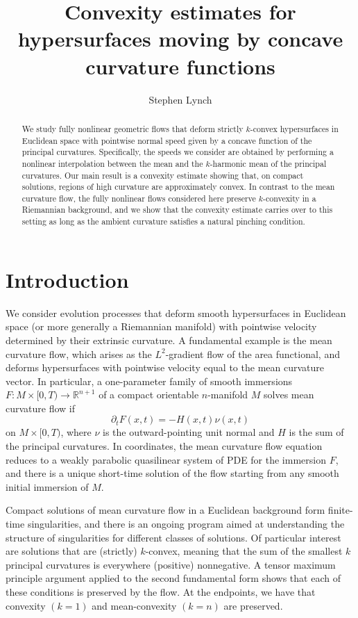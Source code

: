 \documentclass[12pt]{amsart}
\title[Convexity estimates for moving hypersurfaces]{Convexity estimates for hypersurfaces moving by concave curvature functions}
\author{Stephen Lynch}
\begin{document}
\begin{abstract}
We study fully nonlinear geometric flows that deform strictly $k$-convex hypersurfaces in Euclidean space with pointwise normal speed given by a concave function of the principal curvatures. Specifically, the speeds we consider are obtained by performing a nonlinear interpolation between the mean and the $k$-harmonic mean of the principal curvatures. Our main result is a convexity estimate showing that, on compact solutions, regions of high curvature are approximately convex. In contrast to the mean curvature flow, the fully nonlinear flows considered here preserve $k$-convexity in a Riemannian background, and we show that the convexity estimate carries over to this setting as long as the ambient curvature satisfies a natural pinching condition.
\end{abstract}

\maketitle

\section{Introduction}

We consider evolution processes that deform smooth hypersurfaces in Euclidean space (or more generally a Riemannian manifold) with pointwise velocity determined by their extrinsic curvature. A fundamental example is the mean curvature flow, which arises as the $L^2$-gradient flow of the area functional, and deforms hypersurfaces with pointwise velocity equal to the mean curvature vector. In particular, a one-parameter family of smooth immersions $F:M\times[0,T) \to \mathbb{R}^{n+1}$ of a compact orientable $n$-manifold $M$ solves mean curvature flow if 
\[\partial_t F(x,t) = - H(x,t) \nu(x,t)\]
on $M\times[0,T)$, where $\nu$ is the outward-pointing unit normal and $H$ is the sum of the principal curvatures. In coordinates, the mean curvature flow equation reduces to a weakly parabolic quasilinear system of PDE for the immersion $F$, and there is a unique short-time solution of the flow starting from any smooth initial immersion of $M$. 

Compact solutions of mean curvature flow in a Euclidean background form finite-time singularities, and there is an ongoing program aimed at understanding the structure of singularities for different classes of solutions. Of particular interest are solutions that are (strictly) $k$-convex, meaning that the sum of the smallest $k$ principal curvatures is everywhere (positive) nonnegative. A tensor maximum principle argument applied to the second fundamental form shows that each of these conditions is preserved by the flow. At the endpoints, we have that convexity $(k=1)$ and mean-convexity $(k=n)$ are preserved. 
\end{document}
